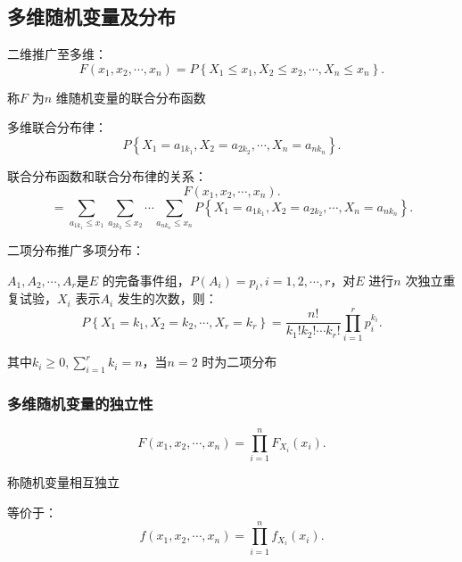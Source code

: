 \subsection{多维随机变量及分布}%
\label{sub:多维随机变量及分布}
\begin{defi}
    二维推广至多维：
    \[
        F\left( x_1,x_2,\cdots,x_n \right) =P\left\{ X_1\le x_1,X_2\le x_2,\cdots,X_n\le x_n \right\} 
    .\] 

    称$F$ 为$n$ 维随机变量的联合分布函数
\end{defi}
\begin{defi}
    多维联合分布律：
    \[
        P\left\{ X_1=a_{1k_1},X_2=a_{2k_2},\cdots,X_n=a_{nk_n} \right\} 
    .\] 
\end{defi}
联合分布函数和联合分布律的关系：\[
    F\left( x_1,x_2,\cdots,x_n \right) 
.\]
\[
    =\sum_{a_{1k_1}\le x_1}\sum_{a_{2k_2}\le x_2}\cdots \sum_{a_{nk_n}\le x_{n}} P\left\{ X_1=a_{1k_1},X_2=a_{2k_2},\cdots,X_n=a_{nk_n} \right\} 
.\] 
\begin{notation}
    二项分布推广多项分布：

    $A_1,A_2,\cdots,A_r$是$E$ 的完备事件组，$P\left( A_i \right) =p_i,i=1,2,\cdots,r$，对$E$ 进行$n$ 次独立重复试验，$X_{i}$ 表示$A_{i}$ 发生的次数，则：\[
        P\left\{ X_1=k_1,X_2=k_2,\cdots,X_r=k_r \right\} =\frac{n!}{k_1!k_2!\cdots k_r!}\prod_{i=1}^{r} p_{i}^{k_i} 
    .\] 

    其中$k_i\ge 0,\displaystyle{\sum_{i=1}^{r} k_i=n}$，当$n=2$ 时为二项分布
\end{notation}

\subsubsection{多维随机变量的独立性}%
\label{subsub:多维随机变量的独立性}
\begin{defi}
    \[
        F\left( x_1,x_2,\cdots,x_n \right) =\prod_{i=1}^{n} F_{X_i}\left( x_i \right) 
    .\] 

    称随机变量相互独立

    等价于：\[
        f\left( x_1,x_2,\cdots,x_n \right) =\prod_{i=1}^{n} f_{X_i}\left( x_i \right)  
    .\] 
\end{defi}

